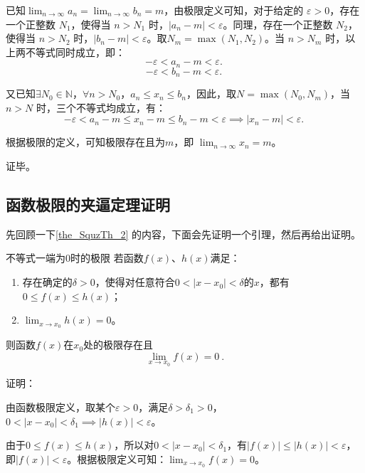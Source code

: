 已知$\lim_{n \to \infty} a_n = \lim_{n \to \infty} b_n = m$，由极限定义可知，对于给定的 $\varepsilon > 0$，存在一个正整数 $N_1$，使得当 $n > N_1$ 时，$|a_n - m| < \varepsilon$。同理，存在一个正整数 $N_2$，使得当 $n > N_2$ 时，$|b_n - m| < \varepsilon$。取$N_m = \max(N_1, N_2)$。当 $n > N_m$ 时，以上两不等式同时成立，即：
\begin{equation}
- \varepsilon < a_n-m <\varepsilon.~
\end{equation}
\begin{equation}
-\varepsilon < b_n-m <\varepsilon.~
\end{equation}

又已知$\exists N_0\in \mathbb{N}$，$\forall n>N_0$，$a_n\leq x_n\leq b_n$，因此，取$N=\max(N_0, N_m)$，当 $n > N$ 时，三个不等式均成立，有：
\begin{equation}
- \varepsilon < a_n-m \leq x_n-m \leq b_n-m <\varepsilon\implies |x_n-m|<\varepsilon.~
\end{equation}

根据极限的定义，可知极限存在且为$m$，即 $\lim_{n \to \infty} x_n = m$。

证毕。


\subsection{函数极限的夹逼定理证明}


先回顾一下\autoref{the_SquzTh_2} 的内容，下面会先证明一个引理，然后再给出证明。

\begin{lemma}{不等式一端为0时的极限}\label{lem_SquzTh_1}
若函数$f(x)$、$h(x)$满足：
\begin{enumerate}
\item 存在确定的$\delta>0$，使得对任意符合$0<|x-x_0|<\delta$的$x$，都有$0\leq f(x)\leq h(x)$；
\item $\lim _{x\to x_0}h(x)=0$。
\end{enumerate}
则函数$f(x)$在$x_0$处的极限存在且
\begin{equation}
\lim _{x\to x_0}f(x)=0~.
\end{equation}

证明：

由函数极限定义，取某个$\varepsilon>0$，满足$\delta>\delta_1>0$，$0<|x-x_0|<\delta_1\implies|h(x)|<\varepsilon$。

由于$0\leq f(x)\leq h(x)$，所以对$0<|x-x_0|<\delta_1$，有$|f(x)|\leq |h(x)|<\varepsilon$，即$|f(x)|<\varepsilon$。根据极限定义可知：$\lim _{x\to x_0}f(x)=0$。

\end{lemma}


